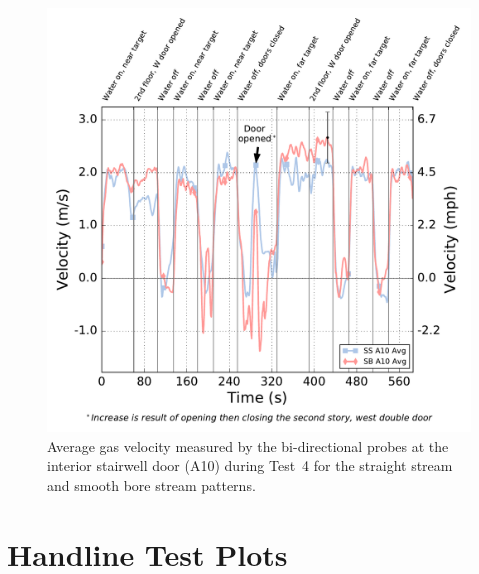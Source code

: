 \documentclass[12pt,oneside]{book}
\begin{document}
\begin{figure}[!ht]
	\includegraphics[width=\columnwidth]{../Figures/Plots/Test_70_West_101215_BDP_A10_stream_avgs}
	\caption[Average gas velocity through the interior stairwell door during Test~4 for the straight stream and smooth bore stream patterns.]{Average gas velocity measured by the bi-directional probes at the interior stairwell door (A10) during Test~4 for the straight stream and smooth bore stream patterns.}
	\label{fig:Test_4_BDP_A10_Avg_All}
	\end{figure}
\FloatBarrier

\chapter{Handline Test Plots}
\label{chap:handline_plots}
\end{document}
